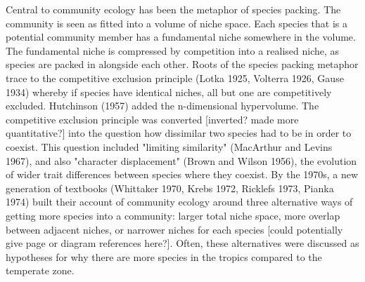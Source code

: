 \documentclass[a4paper,11pt]{article}
\begin{document}
Central to community ecology has been the metaphor of species packing. The community is seen as fitted into a volume of niche space. Each species that is a potential community member has a fundamental niche somewhere in the volume. The fundamental niche is compressed by competition into a realised niche, as species are packed in alongside each other. Roots of the species packing metaphor trace to the competitive exclusion principle (Lotka 1925, Volterra 1926, Gause 1934) whereby if species have identical niches, all but one are competitively excluded. Hutchinson (1957) added the n-dimensional hypervolume. The  competitive exclusion principle was converted [inverted? made more quantitative?] into the question how dissimilar two species had to be in order to coexist. This question included "limiting similarity" (MacArthur and Levins 1967), and also "character displacement" (Brown and Wilson 1956), the evolution of wider trait differences between species where they coexist. By the 1970s, a new generation of textbooks (Whittaker 1970, Krebs 1972, Ricklefs 1973, Pianka 1974) built their account of community ecology around three alternative ways of getting more species into a community: larger total niche space, more overlap between adjacent niches, or narrower niches for each species [could potentially give page or diagram references here?]. Often, these alternatives were discussed as hypotheses for why there are more species in the tropics compared to the temperate zone. 
\end{document}
